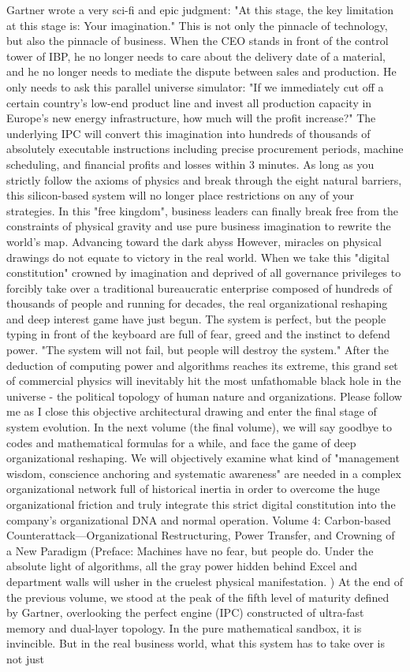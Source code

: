 \documentclass[11pt,a4paper]{article}
\begin{document}
Gartner wrote a very sci-fi and epic judgment: "At this stage, the key limitation at this stage is: Your imagination." This is not only the pinnacle of technology, but also the pinnacle of business. When the CEO stands in front of the control tower of IBP, he no longer needs to care about the delivery date of a material, and he no longer needs to mediate the dispute between sales and production. He only needs to ask this parallel universe simulator: "If we immediately cut off a certain country's low-end product line and invest all production capacity in Europe's new energy infrastructure, how much will the profit increase?" The underlying IPC will convert this imagination into hundreds of thousands of absolutely executable instructions including precise procurement periods, machine scheduling, and financial profits and losses within 3 minutes. As long as you strictly follow the axioms of physics and break through the eight natural barriers, this silicon-based system will no longer place restrictions on any of your strategies. In this "free kingdom", business leaders can finally break free from the constraints of physical gravity and use pure business imagination to rewrite the world's map. Advancing toward the dark abyss However, miracles on physical drawings do not equate to victory in the real world. When we take this "digital constitution" crowned by imagination and deprived of all governance privileges to forcibly take over a traditional bureaucratic enterprise composed of hundreds of thousands of people and running for decades, the real organizational reshaping and deep interest game have just begun. The system is perfect, but the people typing in front of the keyboard are full of fear, greed and the instinct to defend power. "The system will not fail, but people will destroy the system." After the deduction of computing power and algorithms reaches its extreme, this grand set of commercial physics will inevitably hit the most unfathomable black hole in the universe - the political topology of human nature and organizations. Please follow me as I close this objective architectural drawing and enter the final stage of system evolution. In the next volume (the final volume), we will say goodbye to codes and mathematical formulas for a while, and face the game of deep organizational reshaping. We will objectively examine what kind of "management wisdom, conscience anchoring and systematic awareness" are needed in a complex organizational network full of historical inertia in order to overcome the huge organizational friction and truly integrate this strict digital constitution into the company's organizational DNA and normal operation. Volume 4: Carbon-based Counterattack—Organizational Restructuring, Power Transfer, and Crowning of a New Paradigm (Preface: Machines have no fear, but people do. Under the absolute light of algorithms, all the gray power hidden behind Excel and department walls will usher in the cruelest physical manifestation. ) At the end of the previous volume, we stood at the peak of the fifth level of maturity defined by Gartner, overlooking the perfect engine (IPC) constructed of ultra-fast memory and dual-layer topology. In the pure mathematical sandbox, it is invincible. But in the real business world, what this system has to take over is not just 
\end{document}
